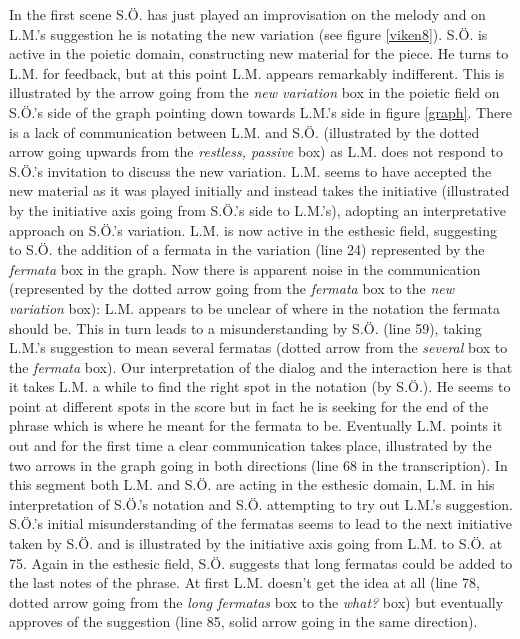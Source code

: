 \documentclass[10pt,letterpaper]{article}
\begin{document}
In the first scene S.{\"O}. has just played an improvisation on the melody
and on L.M.'s suggestion he is notating the new variation (see figure
\ref{viken8}). S.{\"O}. is active in the poietic domain, constructing new
material for the piece. He turns to L.M. for feedback, but at this point
L.M. appears remarkably indifferent. This is illustrated by the arrow
going from the \emph{new variation} box in the poietic field on S.{\"O}.'s
side of the graph pointing down towards L.M.'s side in figure
\ref{graph}.  There is a lack of communication between L.M. and S.{\"O}.
(illustrated by the dotted arrow going upwards from the \emph{restless,
passive} box) as L.M. does not respond to S.{\"O}.'s invitation to discuss
the new variation. L.M. seems to have accepted the new material as it
was played initially and instead takes the initiative (illustrated by
the initiative axis going from S.{\"O}.'s side to L.M.'s), adopting an
interpretative approach on S.{\"O}.'s variation. L.M. is now active in the
esthesic field, suggesting to S.{\"O}. the addition of a fermata in the
variation (line 24) represented by the \emph{fermata} box in the
graph. Now there is apparent noise in the communication (represented by
the dotted arrow going from the \emph{fermata} box to the \emph{new
variation} box): L.M. appears to be unclear of where in the notation the
fermata should be.  This in turn leads to a misunderstanding by S.{\"O}.
(line 59), taking L.M.'s suggestion to mean several fermatas (dotted
arrow from the \emph{several} box to the \emph{fermata} box).  Our
interpretation of the dialog and the interaction here is that it takes
L.M. a while to find the right spot in the notation (by S.{\"O}.). He
seems to point at different spots in the score but in fact he is seeking
for the end of the phrase which is where he meant for the fermata to be.
Eventually L.M. points it out and for the first time a clear
communication takes place, illustrated by the two arrows in the graph
going in both directions (line 68 in the transcription). In this segment
both L.M. and S.{\"O}. are acting in the esthesic domain, L.M. in his
interpretation of S.{\"O}.'s notation and S.{\"O}. attempting to try out
L.M.'s suggestion. S.{\"O}.'s initial misunderstanding of the fermatas
seems to lead to the next initiative taken by S.{\"O}. and is illustrated
by the initiative axis going from L.M. to S.{\"O}. at 75. Again in the
esthesic field, S.{\"O}. suggests that long fermatas could be added to the
last notes of the phrase. At first L.M. doesn't get the idea at all
(line 78, dotted arrow going from the \emph{long fermatas} box to the
\emph{what?} box) but eventually approves of the suggestion (line 85,
solid arrow going in the same direction).\footnotemark 
\end{document}
